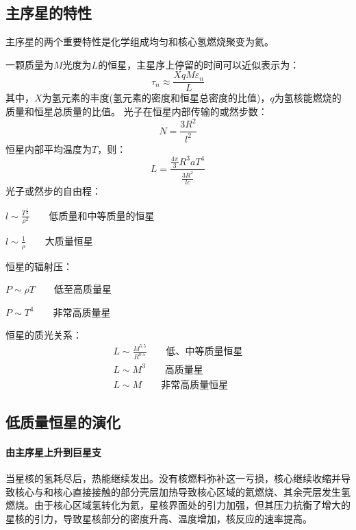 \subsection{主序星的特性}主序星的两个重要特性是化学组成均匀和核心氢燃烧聚变为氦。

一颗质量为$M$光度为$L$的恒星，主星序上停留的时间可以近似表示为：
\begin{equation}
	\tau_{n}\approx\frac{XqM\varepsilon_{n}}{L}
\end{equation}
其中，$X$为氢元素的丰度(氢元素的密度和恒星总密度的比值)，$q$为氢核能燃烧的质量和恒星总质量的比值。
光子在恒星内部传输的或然步数：
\begin{equation}
	N=\frac{3R^2}{l^2}
\end{equation}
恒星内部平均温度为$T$，则：
\begin{equation}
	L=\frac{\frac{4\pi}{3}R^3aT^4}{\frac{3R^2}{lc}}
\end{equation}
光子或然步的自由程：

	$l\sim \frac{T^{\frac{1}{2}}}{\rho^2}\qquad \mbox{低质量和中等质量的恒星}$

	$l\sim\frac{1}{\rho}\qquad\mbox{大质量恒星}$
	
恒星的辐射压：

$P\sim \rho T\qquad \mbox{低至高质量星}$

$P\sim T^4\qquad \mbox{非常高质量星}$

恒星的质光关系：
\begin{equation}
	\begin{aligned}
		L\sim \frac{M^{5.5}}{R^{0.5}}\qquad \mbox{低、中等质量恒星}\\
		L\sim M^3\qquad\mbox{高质量星}\\
		L\sim M\qquad\mbox{非常高质量恒星}
	\end{aligned}
\end{equation}
\subsection{低质量恒星的演化}
\paragraph{由主序星上升到巨星支}当星核的氢耗尽后，热能继续发出。没有核燃料弥补这一亏损，核心继续收缩并导致核心与和核心直接接触的部分壳层加热导致核心区域的氦燃烧、其余壳层发生氢燃烧。由于核心区域氢转化为氦，星核界面处的引力加强，但其压力抗衡了增大的星核的引力，导致星核部分的密度升高、温度增加，核反应的速率提高。

